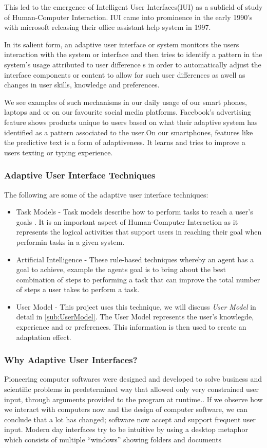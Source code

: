 This led to the emergence of Intelligent User Interfaces(IUI) as a subfield of study of Human-Computer Interaction. IUI came into prominence in the early 1990's with microsoft releasing their office assistant help system in 1997.

In its salient form, an adaptive user interface or system monitors the users interaction with the system or interface and then tries to identify a pattern in the system's usage attributed to user difference s in order to automatically adjust the interface components or content to allow for such user differences as awell as changes in user skills, knowledge and preferences.

We see examples of such mechanisms in our daily usage of our smart phones, laptops and or on our favourite social media platforms. Facebook's advertising feature shows products unique to users based on what their adaptive system has identified as a pattern associated to the user.On our smartphones, features like the predictive text is a form of adaptiveness. It learns and tries to improve a users texting or typing experience.

\subsubsection{Adaptive User Interface Techniques}
The following are some of the adaptive user interface techniques:
\begin{itemize}
    \item Task Models - Task models describe how to perform tasks to reach a user's goals \cite{website:Task-Models}. It is an important aspect of Human-Computer Interaction as it represents the logical activities that support users in reaching their goal when performin tasks in a given system.
    \item Artificial Intelligence - These rule-based techniques whereby an agent has a goal to achieve, example the agents goal is to bring about the best combination of steps to performing a task that can improve the total number of steps a user takes to perform a task.
    \item User Model - This project uses this technique, we will discuss \emph{User Model} in detail in \ref{sub:UserModel}. The User Model represents the user's knowlegde, experience and or preferences. This information is then used to create an adaptation effect.
\end{itemize}


\subsubsection{Why Adaptive User Interfaces?}
Pioneering computer softwares were designed and developed to solve business and scientific problems in predetermined way that allowed only very constrained user input, through arguments provided to the program at runtime.\cite{langley1997machine}.
If we observe how we interact with computers now and the design of computer software, we can conclude that a lot has changed; software now accept and support frequent user input. Modern day interfaces try to be intuitive by using a desktop metaphor which consists of multiple ``windows'' showing folders and documents \cite{patrick2003intelligent}


